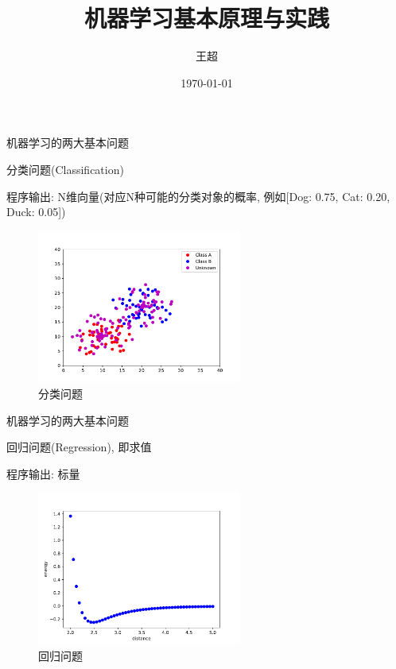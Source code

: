 \documentclass{beamer}
\title{机器学习基本原理与实践}
\author{王超}
\institute{}
\date{\today}
\begin{document}
\frame{\titlepage}


\begin{frame} {机器学习的两大基本问题} 

\begin{block}{分类问题(Classification)}
    {
    程序输出: N维向量(对应N种可能的分类对象的概率, 例如[Dog: 0.75, Cat: 0.20, Duck: 0.05])
    \begin{figure}
    \begin{center}
    \includegraphics[width=0.6\textwidth]{fig/classification.pdf}
    \caption{分类问题}
    \end{center}
    \end{figure}
    }
\end{block}

\end{frame}



\begin{frame} {机器学习的两大基本问题} 

\begin{block}{回归问题(Regression), 即求值}
    {
    程序输出: 标量
    \begin{figure}
    \begin{center}
    \includegraphics[width=0.6\textwidth]{fig/regression.pdf}
    \caption{回归问题}
    \end{center}
    \end{figure}
    }
\end{block}

\end{frame}
\end{document}
